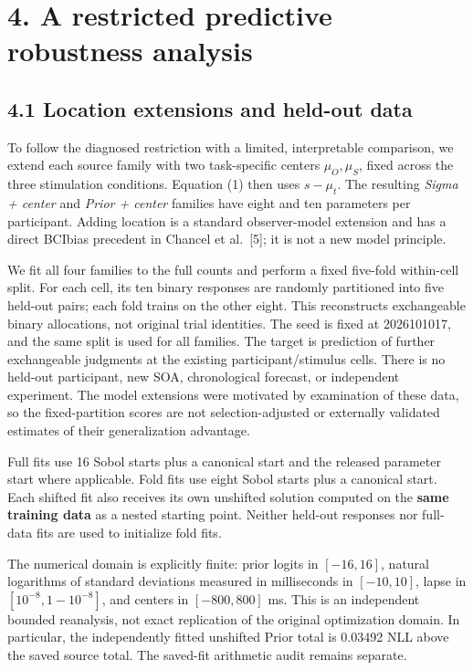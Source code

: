 \documentclass[
  11pt,
]{article}
\let\ctdoldsection\section
\renewcommand{\section}{\Needspace{8\baselineskip}\ctdoldsection}
\let\ctdoldsubsection\subsection
\renewcommand{\subsection}{\Needspace{6\baselineskip}\ctdoldsubsection}
\begin{document}
\hypertarget{a-restricted-predictive-robustness-analysis}{%
\section{4. A restricted predictive robustness
analysis}\label{a-restricted-predictive-robustness-analysis}}

\hypertarget{location-extensions-and-held-out-data}{%
\subsection{4.1 Location extensions and held-out
data}\label{location-extensions-and-held-out-data}}

To follow the diagnosed restriction with a limited, interpretable
comparison, we extend each source family with two task-specific centers
\(\mu_O,\mu_S\), fixed across the three stimulation conditions. Equation
(1) then uses \(s-\mu_t\). The resulting \emph{Sigma + center} and
\emph{Prior + center} families have eight and ten parameters per
participant. Adding location is a standard observer-model extension and
has a direct BCIbias precedent in Chancel et al.~{[}5{]}; it is not a
new model principle.

We fit all four families to the full counts and perform a fixed
five-fold within-cell split. For each cell, its ten binary responses are
randomly partitioned into five held-out pairs; each fold trains on the
other eight. This reconstructs exchangeable binary allocations, not
original trial identities. The seed is fixed at 2026101017, and the same
split is used for all families. The target is prediction of further
exchangeable judgments at the existing participant/stimulus cells. There
is no held-out participant, new SOA, chronological forecast, or
independent experiment. The model extensions were motivated by
examination of these data, so the fixed-partition scores are not
selection-adjusted or externally validated estimates of their
generalization advantage.

Full fits use 16 Sobol starts plus a canonical start and the released
parameter start where applicable. Fold fits use eight Sobol starts plus
a canonical start. Each shifted fit also receives its own unshifted
solution computed on the \textbf{same training data} as a nested
starting point. Neither held-out responses nor full-data fits are used
to initialize fold fits.

The numerical domain is explicitly finite: prior logits in \([-16,16]\),
natural logarithms of standard deviations measured in milliseconds in
\([-10,10]\), lapse in \([10^{-8},1-10^{-8}]\), and centers in
\([-800,800]\) ms. This is an independent bounded reanalysis, not exact
replication of the original optimization domain. In particular, the
independently fitted unshifted Prior total is 0.03492 NLL above the
saved source total. The saved-fit arithmetic audit remains separate.
\end{document}
